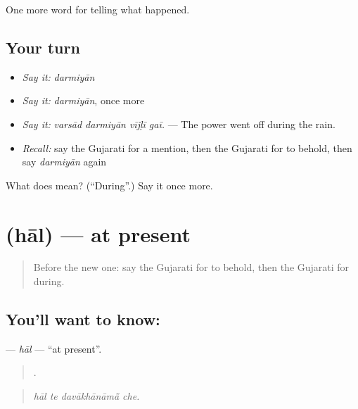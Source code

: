 \begin{grammarlens}[title={What you've built}]
One more word for telling what happened.
\end{grammarlens}

\subsection*{Your turn}
\begin{itemize}
\raggedright
  \item \emph{Say it:} \emph{darmiyān}
  \item \emph{Say it:} \emph{darmiyān}, once more
  \item \emph{Say it:} \emph{varsād darmiyān vījḷī gaī.} — The power went off during the rain.
  \item \emph{Recall:} say the Gujarati for a mention, then the Gujarati for to behold, then say \emph{darmiyān} again
\end{itemize}

\begin{tcolorbox}[breakable,colback=teal!4,colframe=teal!35!black,title={Before you move on}]
What does  mean? (\textquotedblleft{}During\textquotedblright{}.) Say it once more.
\end{tcolorbox}
\section[\texorpdfstring{\gu{હાલ} (hāl)}{હાલ (hāl)}]{ (hāl) — at present}

\label{lesson:GU-C316-hal}



\begin{quote}
Before the new one: say the Gujarati for to behold, then the Gujarati for during.
\end{quote}

\subsection*{You'll want to know: }
\textbf{} — \emph{hāl} — \textquotedblleft{}at present\textquotedblright{}.

\begin{quote}
   .
\end{quote}

\begin{quote}
\emph{hāl te davākhānāmā̃ che.}
\end{quote}

